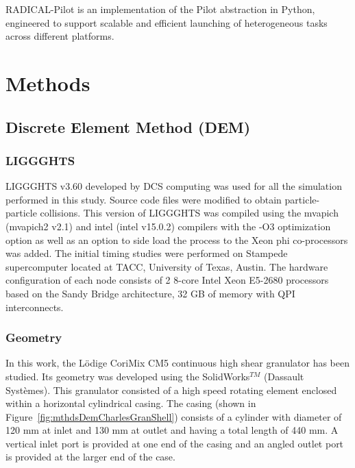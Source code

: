 \documentclass[preprint,11pt,authoryear]{elsarticle}
\begin{document}
RADICAL-Pilot is an implementation of the Pilot abstraction in Python, engineered to
support scalable and efficient launching of heterogeneous tasks across different platforms.

\section{Methods}

\subsection{Discrete Element Method (DEM)}
\subsubsection{LIGGGHTS}
LIGGGHTS v3.60 developed by DCS computing was used for all the simulation performed in this study. 
Source code files were modified to obtain particle-particle 
collisions. This version of LIGGGHTS was compiled using the mvapich (mvapich2 v2.1) 
and intel (intel v15.0.2) compilers with the -O3 optimization option as well as an option to side load the 
process to the Xeon phi co-processors was added. The initial timing studies were performed on Stampede 
supercomputer located at TACC, University of Texas, Austin. The hardware configuration of each node 
consists of 2 8-core Intel Xeon E5-2680 processors based on the Sandy Bridge architecture, 32 GB of 
memory with QPI interconnects.


\subsubsection{Geometry}    
In this work, the L\"{o}dige CoriMix CM5 continuous high shear granulator has been studied. Its 
geometry was developed using the SolidWorks$^{TM}$ (Dassault Syst\`{e}mes). This granulator 
consisted of a high speed rotating element enclosed within a horizontal cylindrical casing. The casing 
(shown in Figure~\ref{fig:mthdsDemCharlesGranShell}) consists of a cylinder with diameter of 120 mm 
at inlet and 130 mm at outlet and having a total length of 440 mm. A vertical inlet port is 
provided at one end of the casing and an angled outlet port is provided at the larger end of the case. 
\end{document}
